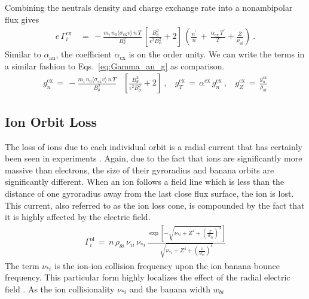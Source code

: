 Combining the neutrals density and charge exchange rate into a nonambipolar flux gives
\begin{align} %
	e\,\Gamma_i^\text{cx} \,&=\,
		-\frac{m_i \,n_0 \langle\sigma_\text{cx} v\rangle \, n\,T}{B_\theta^2}
		\, \left[\frac{B_\theta^2}{\epsilon^2 B_\phi^2} + 2\right] \,
		\left(\frac{n^\prime}{n} \,+\, \frac{\alpha_\text{cx}\,T^\prime}
		{T} + \frac{Z}{\rho_{\theta i}}\right)~. \label{eq:Gamma_cx}
\end{align}
Similar to $\alpha_\text{an}$, the coefficient $\alpha_\text{cx}$ is on the order unity.
We can write the terms in a similar fashion to Eqs.~\ref{eq:Gamma_an_g} as comparison.
\begin{align} %
	g_n^\text{cx} \,=\, -\frac{m_i \,n_0 \langle\sigma_\text{cx} v\rangle \, n \, T}
		{B_\theta^2}& \left[\frac{B_\theta^2}{\epsilon^2 B_\phi^2} + 2\right]
		~,~~~~ g_T^\text{cx} \,=\, \alpha^\text{cx}\,g_n^\text{cx}~,~~~~
		g_Z^\text{cx} \,=\, \frac{g_n^\text{cx}}{\rho_{\theta i}}
		\label{eq:g_cx}
\end{align}


\subsection{Ion Orbit Loss}\label{ssec:ol_loss}
The loss of ions due to each individual orbit is a radial current that has certainly been seen in experiments \cite{weisen_boundary_1991}.
Again, due to the fact that ions are significantly more massive than electrons, the size of their gyroradius and banana orbits are significantly different.
When an ion follows a field line which is less than the distance of one gyroradius away from the last close flux surface, the ion is lost.
This current, also referred to as the ion loss cone, is compounded by the fact that it is highly affected by the electric field.
\begin{align} %
	\Gamma_i^\text{ol} \,=\, n \, \rho_{\theta i} \, \nu_{ii} \, \nu_{*i} \,
		\frac{\exp\left[-\sqrt{\nu_{*i} + Z^4
		+ \left(\frac{x}{w_{bi}}\right)^4}\right]}{\sqrt{\nu_{*i} + Z^4
		+ \left(\frac{x}{w_{bi}}\right)^4}} \label{eq:Gamma_ol}
\end{align}
The term $\nu_{*i}$ is the ion-ion collision frequency upon the ion banana bounce frequency. %
This particular form highly localizes the effect of the radial electric field \cite{kobayashi_experimental_2016}.
As the ion collisionality $\nu_{*i}$ and the banana width $w_{bi}$

